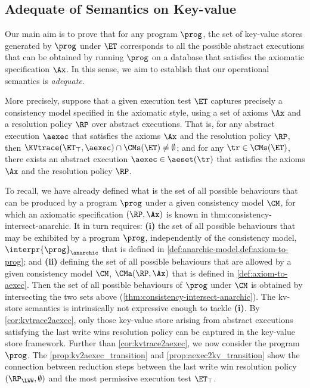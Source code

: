 \subsection{Adequate of Semantics on Key-value}

Our main aim is to prove that for any program $\prog$, 
the set of key-value stores generated by $\prog$ under $\ET$ 
corresponds to all the possible abstract executions that 
can be obtained by running $\prog$ on a database that satisfies the axiomatic specification $\Ax$. 
In this sense, we aim to establish that our operational semantics is \emph{adequate}.

More precisely, suppose that a given execution test $\ET$ captures precisely 
a consistency model specified in the axiomatic style, using a set of 
axioms $\Ax$ and a resolution policy $\RP$ over abstract executions.
That is, for any abstract execution $\aexec$ that satisfies 
the axioms $\Ax$ and the resolution policy $\RP$, then $\KVtrace(\ET_{\top}, \aexec) \cap \CMs(\ET) \neq \emptyset$; 
and for any $\tr \in \CMs(\ET)$, there exists an abstract execution 
$\aexec \in \aeset(\tr)$ that satisfies the axioms $\Ax$ and the resolution policy $\RP$. 



To recall, we have already defined what is the set of all possible behaviours 
that can be produced by a program $\prog$ under a given consistency model $\CM$, for 
which an axiomatic specification $(\RP, \Ax)$ is known in {thm:consistency-intersect-anarchic}. 
It in turn requires: 
\textbf{(i)} the set of all possible behaviours that may be exhibited by a program $\prog$, independently of the consistency model, 
\ie \( \interpr{\prog}_{\anarchic} \) that is defined in \cref{def:anarchic-model,def:axiom-to-prog}; 
and \textbf{(ii)} defining the set of all possible behaviours that 
are allowed by a given consistency model $\CM$, 
\ie \( \CMa(\RP,\Ax) \) that is defined in \cref{def:axiom-to-aexec}.
Then the set of all possible behaviours of $\prog$ under $\CM$ 
is obtained by intersecting the two sets above (\cref{thm:consistency-intersect-anarchic}).
The kv-store semantics is intrinsically not expressive enough to tackle \textbf{(i)}. 
By \cref{cor:kvtrace2aexec}, only those key-value store arising from
abstract executions satisfying the last write wins resolution policy 
can be captured in the key-value store framework.
Further than \cref{cor:kvtrace2aexec}, we now consider the program \( \prog \).
The \cref{prop:kv2aexec_transition} and \cref{prop:aexec2kv_transition} show 
the connection between reduction steps between 
the last write win resolution policy \( (\RP_\LWW, \emptyset) \) 
and the most permissive execution test \( \ET_\top \).

